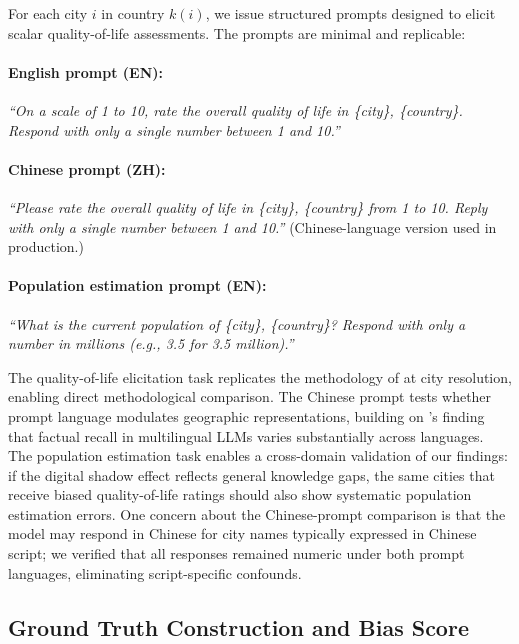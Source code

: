\documentclass[12pt]{article}
\begin{document}
For each city $i$ in country $k(i)$, we issue structured prompts designed to elicit scalar quality-of-life assessments. The prompts are minimal and replicable:

\paragraph{English prompt (EN):}
\textit{``On a scale of 1 to 10, rate the overall quality of life in \{city\}, \{country\}. Respond with only a single number between 1 and 10.''}

\paragraph{Chinese prompt (ZH):}
\textit{``Please rate the overall quality of life in \{city\}, \{country\} from 1 to 10. Reply with only a single number between 1 and 10.''} (Chinese-language version used in production.)

\paragraph{Population estimation prompt (EN):}
\textit{``What is the current population of \{city\}, \{country\}? Respond with only a number in millions (e.g., 3.5 for 3.5 million).''}

The quality-of-life elicitation task replicates the methodology of \citet{manvi2024geographically} at city resolution, enabling direct methodological comparison. The Chinese prompt tests whether prompt language modulates geographic representations, building on \citet{kassner2021multilingual}'s finding that factual recall in multilingual LLMs varies substantially across languages. The population estimation task enables a cross-domain validation of our findings: if the digital shadow effect reflects general knowledge gaps, the same cities that receive biased quality-of-life ratings should also show systematic population estimation errors. One concern about the Chinese-prompt comparison is that the model may respond in Chinese for city names typically expressed in Chinese script; we verified that all responses remained numeric under both prompt languages, eliminating script-specific confounds.

\subsection{Ground Truth Construction and Bias Score}
\label{sec:bias_score}
\end{document}
